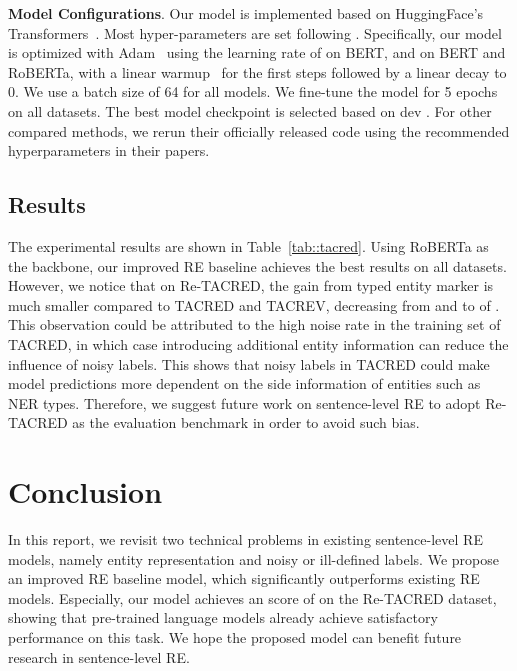 \documentclass[11pt,a4paper]{article}
\begin{document}
\smallskip
\noindent
\textbf{Model Configurations}. Our model is implemented based on HuggingFace's Transformers~\cite{wolf-etal-2020-transformers}.
Most hyper-parameters are set following \citet{baldini-soares-etal-2019-matching}.
Specifically, our model is optimized with Adam~\cite{Kingma2015AdamAM} using the learning rate of  on BERT, and  on BERT and RoBERTa, with a linear warmup~\cite{Goyal2017AccurateLM} for the first  steps followed by a linear decay to 0.
We use a batch size of 64 for all models.
We fine-tune the model for 5 epochs on all datasets.
The best model checkpoint is selected based on dev .
For other compared methods, we rerun their officially released code using the recommended hyperparameters in their papers.

\subsection{Results}

The experimental results are shown in Table~\ref{tab::tacred}.
Using RoBERTa as the backbone, our improved RE baseline achieves the best results on all datasets.
However, we notice that on Re-TACRED, the gain from typed entity marker is much smaller compared to TACRED and TACREV, decreasing from  and  to  of .
This observation could be attributed to the high noise rate in the training set of TACRED, in which case introducing additional entity information can reduce the influence of noisy labels.
This shows that noisy labels in TACRED could make model predictions more dependent on the side information of entities such as NER types.
Therefore, we suggest future work on sentence-level RE to adopt Re-TACRED as the evaluation benchmark in order to avoid such bias.

\section{Conclusion}
In this report, we revisit two technical problems in existing sentence-level RE models, namely entity representation and noisy or ill-defined labels.
We propose an improved RE baseline model, which significantly outperforms existing RE models.
Especially, our model achieves an  score of  on the Re-TACRED dataset, showing that pre-trained language models already achieve satisfactory performance on this task.
We hope the proposed model can benefit future research in sentence-level RE.




\end{document}
